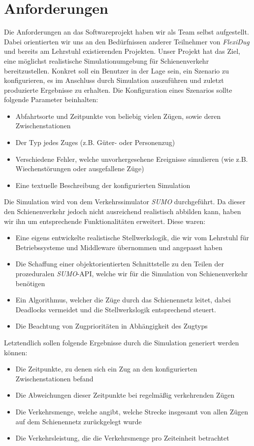 \section{Anforderungen}
Die Anforderungen an das Softwareprojekt haben wir als Team selbst aufgestellt. Dabei orientierten wir uns an den Bedürfnissen anderer Teilnehmer von \emph{FlexiDug} und bereits am Lehrstuhl existierenden Projekten. Unser Projekt hat das Ziel, eine möglichst realistische Simulationumgebung für Schienenverkehr bereitzustellen. Konkret soll ein Benutzer in der Lage sein, ein Szenario zu konfigurieren, es im Anschluss durch Simulation auszuführen und zuletzt produzierte Ergebnisse zu erhalten. Die Konfiguration eines Szenarios sollte folgende Parameter beinhalten:
\begin{itemize}
    \item Abfahrtsorte und Zeitpunkte von beliebig vielen Zügen, sowie deren Zwischenstationen
    \item Der Typ jedes Zuges (z.B. Güter- oder Personenzug)
    \item Verschiedene Fehler, welche unvorhergesehene Ereignisse simulieren (wie z.B. Wiechenstörungen oder ausgefallene Züge)
    \item Eine textuelle Beschreibung der konfigurierten Simulation
\end{itemize}
Die Simulation wird von dem Verkehrssimulator \emph{SUMO} \cite{noauthor_eclipse_nodate} durchgeführt. Da dieser den Schienenverkehr jedoch nicht ausreichend realistisch abbilden kann, haben wir ihn um entsprechende Funktionalitäten erweitert. Diese waren:
\begin{itemize}
    \item Eine eigens entwickelte realistische Stellwerkslogik, die wir vom Lehrstuhl für Betriebssysteme und Middleware übernommen und angepasst haben \cite{noauthor_interlocking_2023}
    \item Die Schaffung einer objektorientierten Schnittstelle zu den Teilen der prozeduralen \emph{SUMO}-API, welche wir für die Simulation von Schienenverkehr benötigen
    \item Ein Algorithmus, welcher die Züge durch das Schienennetz leitet, dabei Deadlocks vermeidet und die Stellwerkslogik entsprechend steuert.
    \item Die Beachtung von Zugprioritäten in Abhängigkeit des Zugtyps
\end{itemize}
Letztendlich sollen folgende Ergebnisse durch die Simulation generiert werden können:
\begin{itemize}
    \item Die Zeitpunkte, zu denen sich ein Zug an den konfigurierten Zwischenstationen befand
    \item Die Abweichungen dieser Zeitpunkte bei regelmäßig verkehrenden Zügen
    \item Die Verkehrsmenge, welche angibt, welche Strecke insgesamt von allen Zügen auf dem Schienennetz zurückgelegt wurde
    \item Die Verkehrsleistung, die die Verkehrsmenge pro Zeiteinheit betrachtet
\end{itemize}

